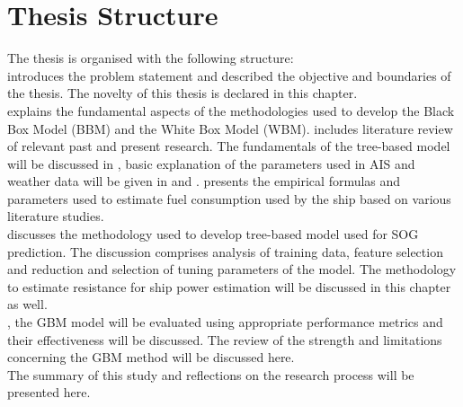 \pagebreak

\section{Thesis Structure}\label{sec:structure_thesis}

The thesis is organised with the following structure:\\

\textbf{} introduces the problem statement and described the objective and boundaries of the thesis. The novelty of this thesis is declared in this chapter.\\

\textbf{} explains the fundamental aspects of the methodologies used to develop the Black Box Model (BBM) and the White Box Model (WBM).  includes literature review of relevant past and present research. The fundamentals of the tree-based model will be discussed in , basic explanation of the parameters used in AIS and weather data will be given in  and .  presents the empirical formulas and parameters used to estimate fuel consumption used by the ship based on various literature studies.\\ 

\textbf{} discusses the methodology used to develop tree-based model used for SOG prediction. The discussion comprises analysis of training data, feature selection and reduction and selection of tuning parameters of the model. The methodology to estimate resistance for ship power estimation will be discussed in this chapter as well.\\ 

\textbf{}, the GBM model will be evaluated using appropriate performance metrics and their effectiveness will be discussed. The review of the strength and limitations concerning the GBM method will be discussed here.\\

\textbf{} The summary of this study and reflections on the research process will be presented here. 




 






